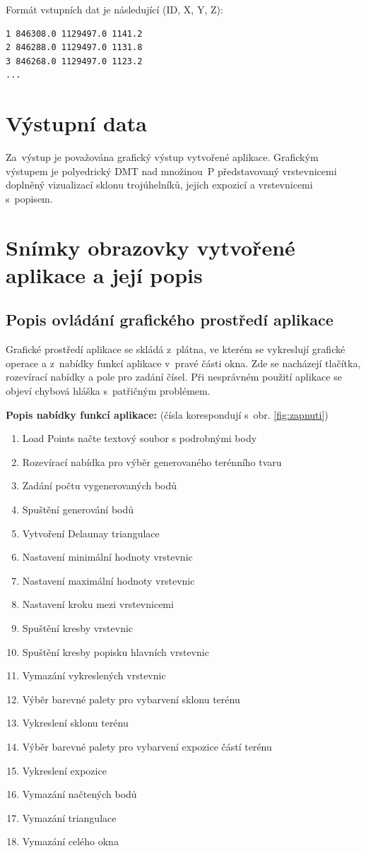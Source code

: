 \documentclass[a4paper, 12pt, oneside, titlepage]{article} %
\begin{document}
Formát vstupních dat je následující (ID, X, Y, Z):
\begin{verbatim}
1 846308.0 1129497.0 1141.2
2 846288.0 1129497.0 1131.8
3 846268.0 1129497.0 1123.2
...
\end{verbatim}


\section{Výstupní data}
Za~výstup je považována grafický výstup vytvořené aplikace. Grafickým výstupem je polyedrický DMT nad množinou~P představovaný vrstevnicemi doplněný vizualizací sklonu trojúhelníků, jejich expozicí a vrstevnicemi s~popisem. 


\section{Snímky obrazovky vytvořené aplikace a její popis}\label{snimky}
\subsection{Popis ovládání grafického prostředí aplikace}
Grafické prostředí aplikace se skládá z~plátna, ve kterém se vykreslují grafické operace a z~nabídky funkcí aplikace v~pravé části okna. Zde se nacházejí tlačítka, rozevírací nabídky a pole pro zadání čísel. Při nesprávném použití aplikace se objeví chybová hláška s~patřičným problémem.

\textbf{Popis nabídky funkcí aplikace:} (čísla korespondují s~obr. \ref{fig:zapnuti})
\begin{enumerate}
\item Load Points načte textový soubor s podrobnými body
\item Rozevírací nabídka pro výběr generovaného terénního tvaru
\item Zadání počtu vygenerovaných bodů
\item Spuštění generování bodů
\item Vytvoření Delaunay triangulace
\item Nastavení minimální hodnoty vrstevnic
\item Nastavení maximální hodnoty vrstevnic
\item Nastavení kroku mezi vrstevnicemi
\item Spuštění kresby vrstevnic
\item Spuštění kresby popisku hlavních vrstevnic
\item Vymazání vykreslených vrstevnic
\item Výběr barevné palety pro vybarvení sklonu terénu
\item Vykreslení sklonu terénu
\item Výběr barevné palety pro vybarvení expozice částí terénu
\item Vykreslení expozice
\item Vymazání načtených bodů
\item Vymazání triangulace
\item Vymazání celého okna
\end{enumerate}
\end{document}
